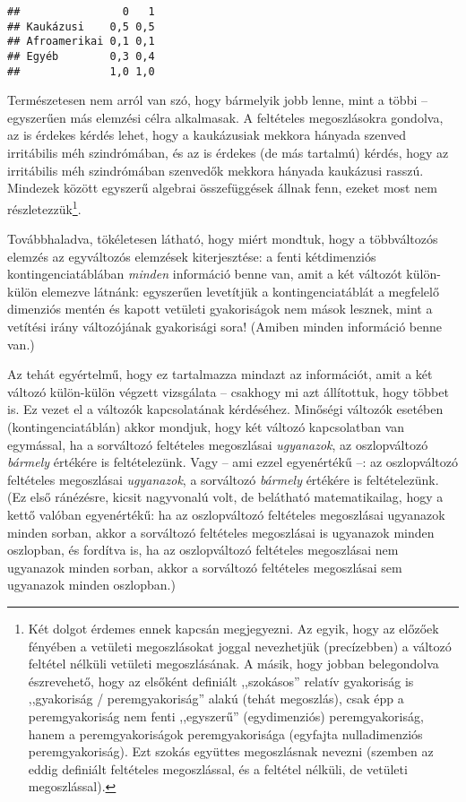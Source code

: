 \documentclass[]{book}
\let\rmarkdownfootnote\footnote%
\def\footnote{\protect\rmarkdownfootnote}
\begin{document}
\begin{verbatim}
##                0   1
## Kaukázusi    0,5 0,5
## Afroamerikai 0,1 0,1
## Egyéb        0,3 0,4
##              1,0 1,0
\end{verbatim}

Természetesen nem arról van szó, hogy bármelyik jobb lenne, mint a többi
-- egyszerűen más elemzési célra alkalmasak. A feltételes megoszlásokra
gondolva, az is érdekes kérdés lehet, hogy a kaukázusiak mekkora hányada
szenved irritábilis méh szindrómában, és az is érdekes (de más tartalmú)
kérdés, hogy az irritábilis méh szindrómában szenvedők mekkora hányada
kaukázusi rasszú. Mindezek között egyszerű algebrai összefüggések állnak
fenn, ezeket most nem
részletezzük\footnote{Két dolgot érdemes ennek kapcsán megjegyezni. Az egyik, hogy az előzőek fényében a vetületi megoszlásokat joggal nevezhetjük (precízebben) a változó feltétel nélküli vetületi megoszlásának. A másik, hogy jobban belegondolva észrevehető, hogy az elsőként definiált ,,szokásos'' relatív gyakoriság is ,,gyakoriság / peremgyakoriság'' alakú (tehát megoszlás), csak épp a peremgyakoriság nem fenti ,,egyszerű'' (egydimenziós) peremgyakoriság, hanem a peremgyakoriságok peremgyakorisága (egyfajta nulladimenziós peremgyakoriság). Ezt szokás együttes megoszlásnak nevezni (szemben az eddig definiált feltételes megoszlással, és a feltétel nélküli, de vetületi megoszlással).}.

Továbbhaladva, tökéletesen látható, hogy miért mondtuk, hogy a
többváltozós elemzés az egyváltozós elemzések kiterjesztése: a fenti
kétdimenziós kontingenciatáblában \emph{minden} információ benne van,
amit a két változót külön-külön elemezve látnánk: egyszerűen levetítjük
a kontingenciatáblát a megfelelő dimenziós mentén és kapott vetületi
gyakoriságok nem mások lesznek, mint a vetítési irány változójának
gyakorisági sora! (Amiben minden információ benne van.)

Az tehát egyértelmű, hogy ez tartalmazza mindazt az információt, amit a
két változó külön-külön végzett vizsgálata -- csakhogy mi azt
állítottuk, hogy többet is. Ez vezet el a változók kapcsolatának
kérdéséhez. Minőségi változók esetében (kontingenciatáblán) akkor
mondjuk, hogy két változó kapcsolatban van egymással, ha a sorváltozó
feltételes megoszlásai \emph{ugyanazok}, az oszlopváltozó \emph{bármely}
értékére is feltételezünk. Vagy -- ami ezzel egyenértékű --: az
oszlopváltozó feltételes megoszlásai \emph{ugyanazok}, a sorváltozó
\emph{bármely} értékére is feltételezünk. (Ez első ránézésre, kicsit
nagyvonalú volt, de belátható matematikailag, hogy a kettő valóban
egyenértékű: ha az oszlopváltozó feltételes megoszlásai ugyanazok minden
sorban, akkor a sorváltozó feltételes megoszlásai is ugyanazok minden
oszlopban, és fordítva is, ha az oszlopváltozó feltételes megoszlásai
nem ugyanazok minden sorban, akkor a sorváltozó feltételes megoszlásai
sem ugyanazok minden oszlopban.)
\end{document}
